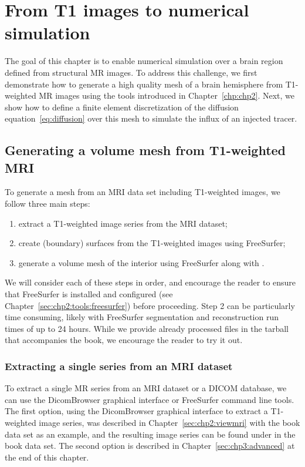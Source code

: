 \chapter{From T1 images to numerical simulation}
\label{chp:chp3}

The goal of this chapter is to enable numerical simulation over a
brain region defined from structural MR images. To address this
challenge, we first demonstrate how to generate a high quality mesh of
a brain hemisphere from T1-weighted MR images using the tools
introduced in Chapter~\ref{chp:chp2}. Next, we show how to define a
finite element discretization of the diffusion
equation~\eqref{eq:diffusion} over this mesh to simulate the influx of
an injected tracer.

\section{Generating a volume mesh from T1-weighted MRI}
\label{sec:chp3:tools}

To generate a mesh from an MRI data set including T1-weighted images,
we follow three main steps:
\begin{enumerate}
\item
  extract a T1-weighted image series from the MRI dataset;
\item
  create (boundary) surfaces from the T1-weighted images using FreeSurfer;
\item
  generate a volume mesh of the interior using FreeSurfer along with \svmtk.
\end{enumerate}
We will consider each of these steps in order, and encourage the
reader to ensure that FreeSurfer is installed and configured (see
Chapter~\ref{sec:chp2:tools:freesurfer}) before proceeding. Step 2 can
be particularly time consuming, likely with FreeSurfer segmentation
and reconstruction run times of up to 24 hours.
While we provide already processed files in the tarball that accompanies
the book, we encourage the reader to try it out. 
 
\subsection{Extracting a single series from an MRI dataset}

To extract a single MR series from an MRI dataset or a DICOM database,
we can use the DicomBrowser graphical interface or FreeSurfer command
line tools. The first option, using the DicomBrowser graphical
interface to extract a T1-weighted image series, was described in
Chapter~\ref{sec:chp2:viewmri} with the book data set as an example,
and the resulting image series can be found under  in
the book data set. The second option is described in
Chapter~\ref{sec:chp3:advanced} at the end of this chapter.

